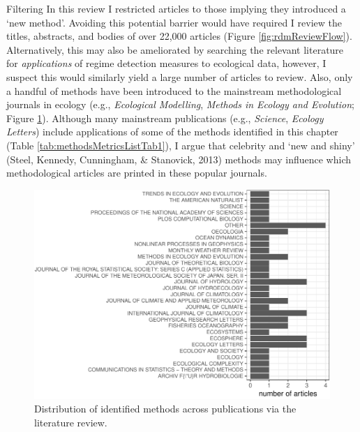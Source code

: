 \documentclass[12pt,twoside,openany]{reedthesis}
\begin{document}
Filtering In this review I restricted articles to those implying they introduced a `new method'. Avoiding this potential barrier would have required I review the titles, abstracts, and bodies of over 22,000 articles (Figure \ref{fig:rdmReviewFlow}). Alternatively, this may also be ameliorated by searching the relevant literature for \emph{applications} of regime detection measures to ecological data, however, I suspect this would similarly yield a large number of articles to review. Also, only a handful of methods have been introduced to the mainstream methodological journals in ecology (e.g., \emph{Ecological Modelling}, \emph{Methods in Ecology and Evolution}; Figure \ref{fig:jrnlDistFig}). Although many mainstream publications (e.g., \emph{Science}, \emph{Ecology Letters}) include applications of some of the methods identified in this chapter (Table \ref{tab:methodsMetricsListTab1}), I argue that celebrity and `new and shiny' (Steel, Kennedy, Cunningham, \& Stanovick, 2013) methods may influence which methodological articles are printed in these popular journals.
\begin{figure}
\centering
\includegraphics{_myDissertation_files/figure-latex/jrnlDistFig-1.pdf}
\caption{\label{fig:jrnlDistFig}Distribution of identified methods across publications via the literature review.}
\end{figure}
\end{document}
